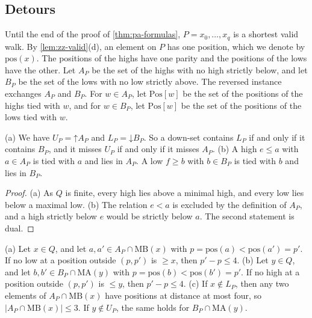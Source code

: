 \documentclass[pdflatex,sn-mathphys-num]{sn-jnl}%
\theoremstyle{thmstyleone}%
\theoremstyle{thmstyletwo}%
\theoremstyle{thmstylethree}%
\newcommand{\dn}{\mathord{\downarrow}}%
\newcommand{\upp}{\mathord{\uparrow}}%
\newcommand{\pos}{\mathrm{pos}}%
\newcommand{\MB}{\mathrm{MB}}%
\newcommand{\MA}{\mathrm{MA}}%
\newcommand{\Pos}{\mathrm{Pos}}%
\begin{document}
\subsection{Detours}
\label{sec:pa-detours}

Until the end of the proof of \cref{thm:pa-formulas}, $P = x_0, \dots, x_q$ is a shortest valid walk.
By \cref{lem:zz-valid}(d), an element on $P$ has one position, which we denote by $\pos(x)$.
The positions of the highs have one parity and the positions of the lows have the other.
Let $A_P$ be the set of the highs with no high strictly below, and let $B_P$ be the set of the lows with no low strictly above.
The reversed instance exchanges $A_P$ and $B_P$.
For $w \in A_P$, let $\Pos[w]$ be the set of the positions of the highs tied with $w$, and for $w \in B_P$, let $\Pos[w]$ be the set of the positions of the lows tied with $w$.

\begin{lemma}
\label{lem:pa-basic}
(a) We have $U_P = \upp A_P$ and $L_P = \dn B_P$.
So a down-set contains $L_P$ if and only if it contains $B_P$, and it misses $U_P$ if and only if it misses $A_P$.
(b) A high $e \leq a$ with $a \in A_P$ is tied with $a$ and lies in $A_P$.
A low $f \geq b$ with $b \in B_P$ is tied with $b$ and lies in $B_P$.
\end{lemma}

\begin{proof}
(a) As $Q$ is finite, every high lies above a minimal high, and every low lies below a maximal low.
(b) The relation $e < a$ is excluded by the definition of $A_P$, and a high strictly below $e$ would be strictly below $a$.
The second statement is dual.
\end{proof}

\begin{lemma}
\label{lem:pa-one}
(a) Let $x \in Q$, and let $a, a' \in A_P \cap \MB(x)$ with $p = \pos(a) < \pos(a') = p'$.
If no low at a position outside $(p, p')$ is $\geq x$, then $p' - p \leq 4$.
(b) Let $y \in Q$, and let $b, b' \in B_P \cap \MA(y)$ with $p = \pos(b) < \pos(b') = p'$.
If no high at a position outside $(p, p')$ is $\leq y$, then $p' - p \leq 4$.
(c) If $x \notin L_P$, then any two elements of $A_P \cap \MB(x)$ have positions at distance at most four, so $|A_P \cap \MB(x)| \leq 3$.
If $y \notin U_P$, the same holds for $B_P \cap \MA(y)$.
\end{lemma}
\end{document}
